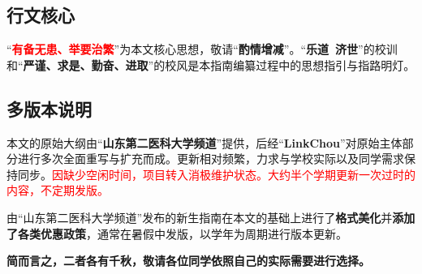 \subsection[行文核心]{行文核心}
“\textcolor{red}{\textbf{有备无患、举要治繁}}”为本文核心思想，敬请“\textbf{酌情增减}”。“\textbf{乐道\ 济世}”的校训和“\textbf{严谨、求是、勤奋、进取}”的校风是本指南编纂过程中的思想指引与指路明灯。

\subsection[多版本说明]{多版本说明}
本文的原始大纲由“\textbf{山东第二医科大学频道}”提供，后经“\textbf{LinkChou}”对原始主体部分进行多次全面重写与扩充而成。更新相对频繁，力求与学校实际以及同学需求保持同步。\textcolor{red}{因缺少空闲时间，项目转入消极维护状态。大约半个学期更新一次过时的内容，不定期发版。}

由“山东第二医科大学频道”发布的新生指南在本文的基础上进行了\textbf{格式美化}并\textbf{添加了各类优惠政策}，通常在暑假中发版，以学年为周期进行版本更新。

\textbf{简而言之，二者各有千秋，敬请各位同学依照自己的实际需要进行选择。}
